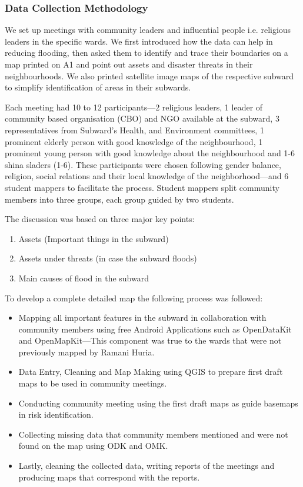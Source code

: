\documentclass[a4paper,12pt,twoside]{article}
\begin{document}
\subsubsection{Data Collection Methodology}
We set up meetings with community leaders and influential people i.e. religious leaders in the specific wards. We first introduced how the data can help in reducing flooding, then asked them to identify and trace their boundaries on a map printed on A1 and point out assets and disaster threats in their neighbourhoods. We also printed satellite image maps of the respective subward to simplify identification of areas in their subwards.

Each meeting had 10 to 12 participants---2 religious leaders, 1 leader of community based organisation (CBO) and NGO available at the subward, 3 representatives from Subward’s Health, and Environment committees, 1 prominent elderly person with good knowledge of the neighbourhood, 1 prominent young person with good knowledge about the neighbourhood and 1-6 shina sladers (1-6). These participants were chosen following gender balance, religion, social relations and their local knowledge of the neighborhood---and 6 student mappers to facilitate the process. Student mappers split community members into three groups, each group guided by two students.

The discussion was based on three major key points:
\begin{enumerate}
    \item Assets (Important things in the subward)
    \item Assets under threats (in case the subward floods)
    \item Main causes of flood in the subward
\end{enumerate}

To develop a complete detailed map the following process was followed:
\begin{itemize}
    \item Mapping all important features in the subward in collaboration with community members using free Android Applications such as OpenDataKit and OpenMapKit---This component was true to the wards that were not previously mapped by Ramani Huria.
    \item Data Entry, Cleaning and Map Making using QGIS to prepare first draft maps to be used in community meetings.
    \item Conducting community meeting using the first draft maps as guide basemaps in risk identification.
    \item Collecting missing data that community members mentioned and were not found on the map using ODK and OMK.
    \item Lastly, cleaning the collected data, writing reports of the meetings and producing maps that correspond with the reports.
\end{itemize}
\end{document}
